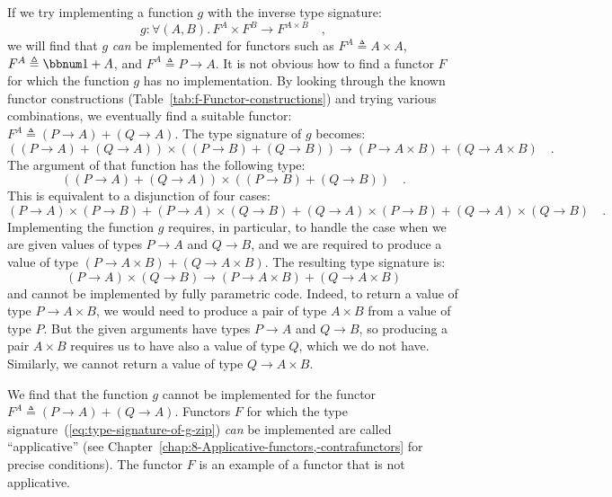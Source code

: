 If we try implementing a function $g$ with the inverse type signature:
\begin{equation}
g:\forall(A,B).\,F^{A}\times F^{B}\rightarrow F^{A\times B}\quad,\label{eq:type-signature-of-g-zip}
\end{equation}
we will find that $g$ \emph{can} be implemented for functors such
as $F^{A}\triangleq A\times A$, $F^{A}\triangleq\bbnum 1+A$, and
$F^{A}\triangleq P\rightarrow A$. It is not obvious how to find a
functor $F$ for which the function $g$ has no implementation. By
looking through the known functor constructions (Table~\ref{tab:f-Functor-constructions})
and trying various combinations, we eventually find a suitable functor:
$F^{A}\triangleq(P\rightarrow A)+(Q\rightarrow A)$. The type signature
of $g$ becomes:
\[
\left((P\rightarrow A)+(Q\rightarrow A)\right)\times\left((P\rightarrow B)+(Q\rightarrow B)\right)\rightarrow(P\rightarrow A\times B)+(Q\rightarrow A\times B)\quad.
\]
The argument of that function has the following type:
\[
\left((P\rightarrow A)+(Q\rightarrow A)\right)\times\left((P\rightarrow B)+(Q\rightarrow B)\right)\quad.
\]
This is equivalent to a disjunction of four cases:
\[
(P\rightarrow A)\times(P\rightarrow B)+(P\rightarrow A)\times(Q\rightarrow B)+(Q\rightarrow A)\times(P\rightarrow B)+(Q\rightarrow A)\times(Q\rightarrow B)\quad.
\]
Implementing the function $g$ requires, in particular, to handle
the case when we are given values of types $P\rightarrow A$ and $Q\rightarrow B$,
and we are required to produce a value of type $(P\rightarrow A\times B)+(Q\rightarrow A\times B)$.
The resulting type signature is:
\[
(P\rightarrow A)\times(Q\rightarrow B)\rightarrow(P\rightarrow A\times B)+(Q\rightarrow A\times B)
\]
and cannot be implemented by fully parametric code. Indeed, to return
a value of type $P\rightarrow A\times B$, we would need to produce
a pair of type $A\times B$ from a value of type $P$. But the given
arguments have types $P\rightarrow A$ and $Q\rightarrow B$, so producing
a pair $A\times B$ requires us to have also a value of type $Q$,
which we do not have. Similarly, we cannot return a value of type
$Q\rightarrow A\times B$.

We find that the function $g$ cannot be implemented for the functor
$F^{A}\triangleq(P\rightarrow A)+(Q\rightarrow A)$. Functors $F$
for which the type signature~(\ref{eq:type-signature-of-g-zip})
\emph{can} be implemented are called \textsf{``}applicative\textsf{''}
(see Chapter~\ref{chap:8-Applicative-functors,-contrafunctors} for
precise conditions). The functor $F$ is an example of a functor that
is not applicative.

